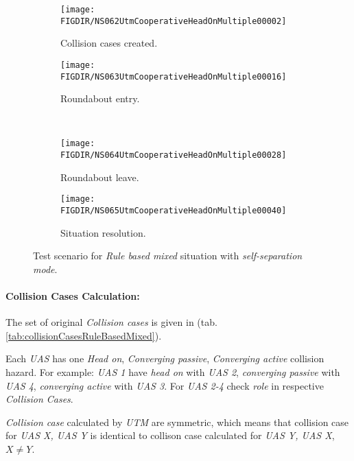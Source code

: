     
    \begin{figure}[H]
        \centering
        \begin{subfigure}{0.48\textwidth}
        	\centering
            \texttt{[image: \\FIGDIR/NS062UtmCooperativeHeadOnMultiple00002]}
            \caption{Collision cases created.}
            \label{fig:ruleMultipleCollisionCasesCreated}
        \end{subfigure}
        \begin{subfigure}{0.48\textwidth}
        	\centering
            \texttt{[image: \\FIGDIR/NS063UtmCooperativeHeadOnMultiple00016]} 
            \caption{Roundabout entry.}
            \label{fig:ruleMultipleRoundabountEntry}
        \end{subfigure}
        \\
        \begin{subfigure}{0.48\textwidth}
        	\centering
            \texttt{[image: \\FIGDIR/NS064UtmCooperativeHeadOnMultiple00028]} 
            \caption{Roundabout leave.}
            \label{fig:ruleMultipleRoundaboutLeave}
        \end{subfigure}
        \begin{subfigure}{0.48\textwidth}
        	\centering
            \texttt{[image: \\FIGDIR/NS065UtmCooperativeHeadOnMultiple00040]} 
            \caption{Situation resolution.}
            \label{fig:ruleMultipleSituationResolution}
        \end{subfigure}
        \caption{Test scenario for \emph{Rule based mixed} situation with \emph{self-separation mode}.}
        \label{fig:testCaseRuleBasedMixed}
    \end{figure}

	\newpage    
    \paragraph{Collision Cases Calculation:} The set of original \emph{Collision cases} is given in (tab. \ref{tab:collisionCasesRuleBasedMixed}). 
    
    Each \emph{UAS} has one \emph{Head on}, \emph{Converging passive}, \emph{Converging active} collision hazard. For example: \emph{UAS 1} have \emph{head on} with  \emph{UAS 2}, \emph{converging passive} with \emph{UAS 4}, \emph{converging active} with \emph{UAS 3}. For \emph{UAS 2-4} check \emph{role} in respective \emph{Collision Cases}.
    
    \begin{note} \emph{Collision case} calculated by \emph{UTM} are symmetric, which means that collision case for \emph{UAS X, UAS Y} is identical to collison case calculated for \emph{UAS Y, UAS X}, $X \neq Y$.
    \end{note}
    

